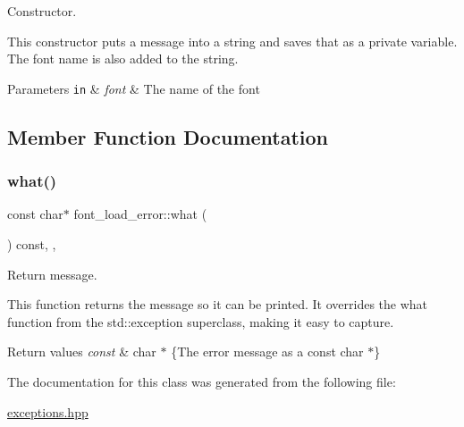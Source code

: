 Constructor. 

This constructor puts a message into a string and saves that as a private variable. The font name is also added to the string.


\begin{DoxyParams}[1]{Parameters}
\mbox{\tt in}  & {\em font} & The name of the font \\
\hline
\end{DoxyParams}


\subsection{Member Function Documentation}
\mbox{\label{classfont__load__error_a17c3014c5953ab5863585e4cbf8865c3}} 
\subsubsection{\texorpdfstring{what()}{what()}}
{\footnotesize\ttfamily const char$\ast$ font\+\_\+load\+\_\+error\+::what (\begin{DoxyParamCaption}{ }\end{DoxyParamCaption}) const\hspace{0.3cm}{\ttfamily [inline]}, {\ttfamily [override]}, {\ttfamily [noexcept]}}



Return message. 

This function returns the message so it can be printed. It overrides the what function from the std\+::exception superclass, making it easy to capture.


\begin{DoxyRetVals}{Return values}
{\em const} & char $\ast$ \{The error message as a const char $\ast$\} \\
\hline
\end{DoxyRetVals}


The documentation for this class was generated from the following file\+:\begin{DoxyCompactItemize}
\item 
\hyperlink{exceptions_8hpp}{exceptions.\+hpp}\end{DoxyCompactItemize}
